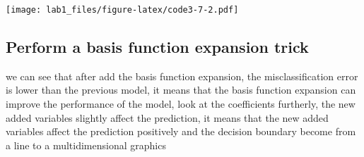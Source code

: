 \documentclass[
]{article}
\newenvironment{Shaded}{\begin{snugshade}}{\end{snugshade}}
\newcommand{\AttributeTok}[1]{\textcolor[rgb]{0.13,0.29,0.53}{#1}}
\newcommand{\FloatTok}[1]{\textcolor[rgb]{0.00,0.00,0.81}{#1}}
\newcommand{\FunctionTok}[1]{\textcolor[rgb]{0.13,0.29,0.53}{\textbf{#1}}}
\newcommand{\NormalTok}[1]{#1}
\newcommand{\SpecialCharTok}[1]{\textcolor[rgb]{0.81,0.36,0.00}{\textbf{#1}}}
\newcommand{\StringTok}[1]{\textcolor[rgb]{0.31,0.60,0.02}{#1}}
\begin{document}
\begin{Shaded}
\end{Shaded}

\texttt{[image: lab1\_files/figure-latex/code3-7-2.pdf]}

\subsection{Perform a basis function expansion
trick}\label{perform-a-basis-function-expansion-trick}

we can see that after add the basis function expansion, the
misclassification error is lower than the previous model, it means that
the basis function expansion can improve the performance of the model,
look at the coefficients furtherly, the new added variables slightly
affect the prediction, it means that the new added variables affect the
prediction positively and the decision boundary become from a line to a
multidimensional graphics
\end{document}
